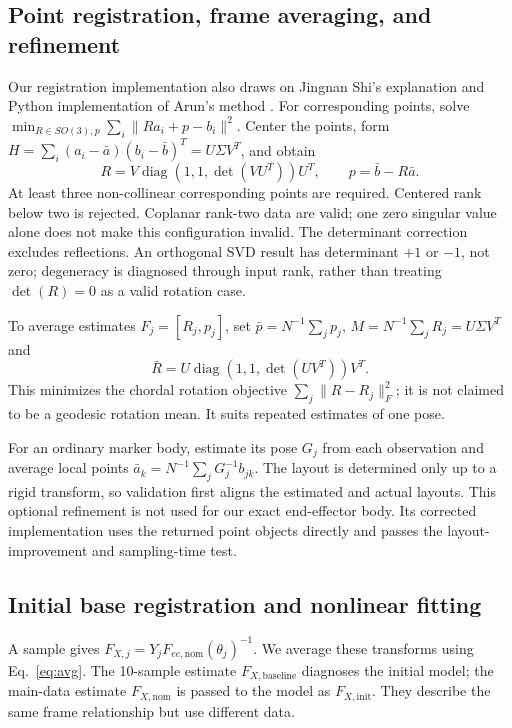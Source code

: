 \documentclass[11pt]{article}
\begin{document}
\subsection{Point registration, frame averaging, and refinement}
Our registration implementation also draws on Jingnan Shi's explanation and Python implementation of Arun's method \cite{shi_arun}.
For corresponding points, solve $\min_{R\in SO(3),p}\sum_i\|Ra_i+p-b_i\|^2$. Center the points, form $H=\sum_i(a_i-\bar a)(b_i-\bar b)^T=U\Sigma V^T$, and obtain \cite{rigid,shi_arun}
\begin{equation}
 R=V\operatorname{diag}(1,1,\det(VU^T))U^T,\qquad p=\bar b-R\bar a.
\end{equation}
At least three non-collinear corresponding points are required. Centered rank below two is rejected. Coplanar rank-two data are valid; one zero singular value alone does not make this configuration invalid. The determinant correction excludes reflections. An orthogonal SVD result has determinant $+1$ or $-1$, not zero; degeneracy is diagnosed through input rank, rather than treating $\det(R)=0$ as a valid rotation case.

To average estimates $F_j=[R_j,p_j]$, set $\bar p=N^{-1}\sum_jp_j$, $M=N^{-1}\sum_jR_j=U\Sigma V^T$ and
\begin{equation}
 \bar R=U\operatorname{diag}(1,1,\det(UV^T))V^T.
 \label{eq:avg}
\end{equation}
This minimizes the chordal rotation objective $\sum_j\|R-R_j\|_F^2$; it is not claimed to be a geodesic rotation mean. It suits repeated estimates of one pose.

For an ordinary marker body, estimate its pose $G_j$ from each observation and average local points $\bar a_k=N^{-1}\sum_jG_j^{-1}b_{jk}$. The layout is determined only up to a rigid transform, so validation first aligns the estimated and actual layouts. This optional refinement is not used for our exact end-effector body. Its corrected implementation uses the returned point objects directly and passes the layout-improvement and sampling-time test.

\subsection{Initial base registration and nonlinear fitting}
A sample gives $F_{X,j}=Y_jF_{ee,\mathrm{nom}}(\theta_j)^{-1}$. We average these transforms using Eq.~\eqref{eq:avg}. The 10-sample estimate $F_{X,\mathrm{baseline}}$ diagnoses the initial model; the main-data estimate $F_{X,\mathrm{nom}}$ is passed to the model as $F_{X,\mathrm{init}}$. They describe the same frame relationship but use different data.
\end{document}
